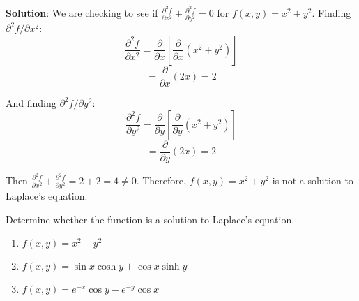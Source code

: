 \textbf{Solution}: We are checking to see if $\frac{\partial^2 f}{\partial 
x^2} + \frac{\partial^2 f}{\partial y^2} = 0$ for $f(x, y) = x^2 + y^2$. 
Finding $\partial^2 f / \partial x^2$:
$$\frac{\partial^2 f}{\partial x^2} = \frac{\partial}{\partial x} \left[ \frac{
\partial}{\partial x} \left( x^2 + y^2 \right) \right]$$
$$= \frac{\partial}{\partial x} \left( 2x \right) = 2$$

And finding $\partial^2 f / \partial y^2$:
$$\frac{\partial^2 f}{\partial y^2} = \frac{\partial}{\partial y} \left[ \frac{
\partial}{\partial y} \left( x^2 + y^2 \right) \right]$$
$$= \frac{\partial}{\partial y} \left( 2x \right) = 2$$

Then $\frac{\partial^2 f}{\partial x^2} + \frac{\partial^2 f}{\partial y^2} = 
2 + 2 = 4 \neq 0$. Therefore, $f(x, y) = x^2 + y^2$ is not a solution to 
Laplace's equation. 

\begin{Exercise}[title = {Solutions to Laplace's Equation}, label = laplace]
Determine whether the function is a solution to Laplace's equation. 
\begin{enumerate}
    \item $f(x, y) = x^2 - y^2$
    \item $f(x, y) = \sin{x} \cosh{y} + \cos{x} \sinh{y}$
    \item $f(x, y) = e^{-x} \cos{y} - e^{-y} \cos{x}$
\end{enumerate}
\vspace{50mm}
\end{Exercise}

